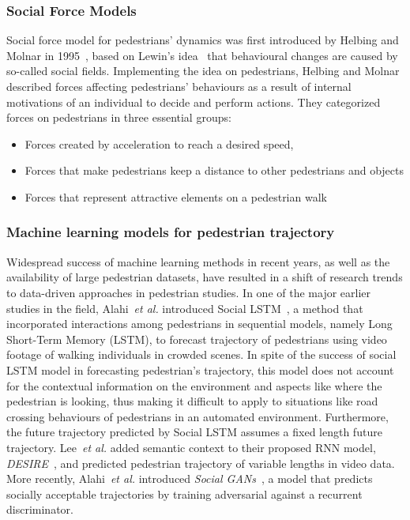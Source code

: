 \subsubsection{Social Force Models}
Social force model for pedestrians’ dynamics was first introduced by Helbing and Molnar in 1995~\cite{helbing1995social}, based on Lewin’s idea~\cite{lewin1951field} that behavioural changes are caused by so-called social fields. Implementing the idea on pedestrians, Helbing and Molnar described forces affecting pedestrians’ behaviours as a result of internal motivations of an individual to decide and perform actions. They categorized forces on pedestrians in three essential groups:
\begin{itemize}
    \item Forces created by acceleration to reach a desired speed,
    \item Forces that make pedestrians keep a distance to other pedestrians and objects
    \item Forces that represent attractive elements on a pedestrian walk
\end{itemize}

\subsubsection{Machine learning models for pedestrian trajectory}
Widespread success of machine learning methods in recent years, as well as the availability of large pedestrian datasets, have resulted in a shift of research trends to data-driven approaches in pedestrian studies. In one of the major earlier studies in the field, Alahi~\textit{et al.} introduced Social LSTM~\cite{alahi2016social}, a method that incorporated interactions among pedestrians in sequential models, namely Long Short-Term Memory (LSTM), to forecast trajectory of pedestrians using video footage of walking individuals in crowded scenes. In spite of the success of social LSTM model in forecasting pedestrian's trajectory, this model does not account for the contextual information on the environment and aspects like where the pedestrian is looking, thus making it difficult to apply to situations like road crossing behaviours of pedestrians in an automated environment. Furthermore, the future trajectory predicted by Social LSTM assumes a fixed length future trajectory. Lee~\textit{et al.} added semantic context to their proposed RNN model, \textit{DESIRE}~\cite{lee2017desire}, and predicted pedestrian trajectory of variable lengths in video data. More recently, Alahi~\textit{et al.} introduced \textit{Social GANs}~\cite{gupta2018social}, a model that predicts socially acceptable trajectories by training adversarial against a recurrent discriminator. 

